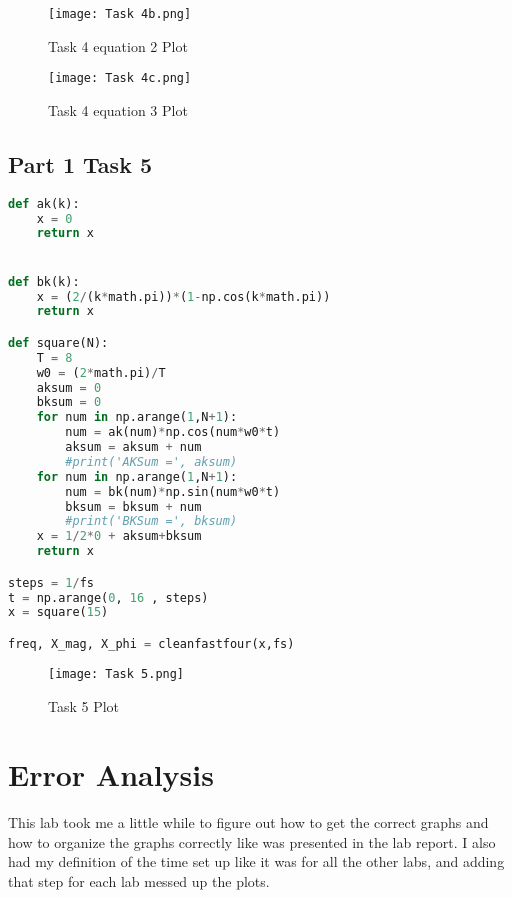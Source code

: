 \documentclass[11pt,a4]{report}
\begin{document}
\newpage
\begin{figure}[h!]
    \begin{center}
  \caption{Task 4 equation 2 Plot}
  \texttt{[image: Task 4b.png]}
\end{center}
\end{figure}

\begin{figure}[h!]
    \begin{center}
  \caption{Task 4 equation 3 Plot}
  \texttt{[image: Task 4c.png]}
\end{center}
\end{figure}

\subsection{Part 1 Task 5}
\begin{lstlisting}[language=Python]
def ak(k):
    x = 0
    return x


def bk(k):
    x = (2/(k*math.pi))*(1-np.cos(k*math.pi))
    return x

def square(N):
    T = 8
    w0 = (2*math.pi)/T
    aksum = 0
    bksum = 0
    for num in np.arange(1,N+1):
        num = ak(num)*np.cos(num*w0*t)
        aksum = aksum + num
        #print('AKSum =', aksum)
    for num in np.arange(1,N+1):
        num = bk(num)*np.sin(num*w0*t)
        bksum = bksum + num
        #print('BKSum =', bksum)
    x = 1/2*0 + aksum+bksum
    return x

steps = 1/fs
t = np.arange(0, 16 , steps)
x = square(15)

freq, X_mag, X_phi = cleanfastfour(x,fs)
\end{lstlisting}

\begin{figure}[h!]
    \begin{center}
  \caption{Task 5 Plot}
  \texttt{[image: Task 5.png]}
\end{center}
\end{figure}





\section{Error Analysis}
This lab took me a little while to figure out how to get the correct graphs and how to organize the graphs correctly like was presented in the lab report. I also had my definition of the time set up like it was for all the other labs, and adding that step for each lab messed up the plots.
\end{document}
